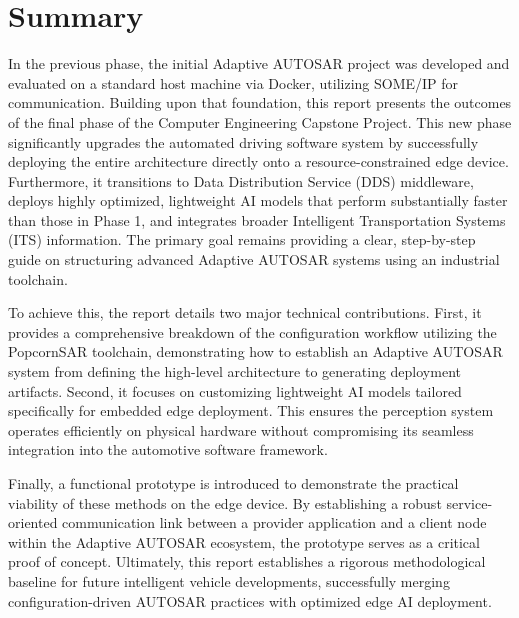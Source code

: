 \chapter*{Summary}

In the previous phase, the initial Adaptive AUTOSAR project was developed and evaluated on a standard host machine via Docker, utilizing SOME/IP for communication. Building upon that foundation, this report presents the outcomes of the final phase of the Computer Engineering Capstone Project. This new phase significantly upgrades the automated driving software system by successfully deploying the entire architecture directly onto a resource-constrained edge device. Furthermore, it transitions to Data Distribution Service (DDS) middleware, deploys highly optimized, lightweight AI models that perform substantially faster than those in Phase 1, and integrates broader Intelligent Transportation Systems (ITS) information. The primary goal remains providing a clear, step-by-step guide on structuring advanced Adaptive AUTOSAR systems using an industrial toolchain.

To achieve this, the report details two major technical contributions. First, it provides a comprehensive breakdown of the configuration workflow utilizing the PopcornSAR toolchain, demonstrating how to establish an Adaptive AUTOSAR system from defining the high-level architecture to generating deployment artifacts. Second, it focuses on customizing lightweight AI models tailored specifically for embedded edge deployment. This ensures the perception system operates efficiently on physical hardware without compromising its seamless integration into the automotive software framework.

Finally, a functional prototype is introduced to demonstrate the practical viability of these methods on the edge device. By establishing a robust service-oriented communication link between a provider application and a client node within the Adaptive AUTOSAR ecosystem, the prototype serves as a critical proof of concept. Ultimately, this report establishes a rigorous methodological baseline for future intelligent vehicle developments, successfully merging configuration-driven AUTOSAR practices with optimized edge AI deployment.

\clearpage
